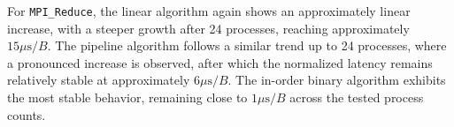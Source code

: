 \documentclass[a4paper]{article}
\begin{document}
For \texttt{MPI\_Reduce}, the linear algorithm again shows an approximately linear increase, with a steeper growth after 24 processes, reaching approximately $15\mu\mathrm{s}/B$. The pipeline algorithm follows a similar trend up to 24 processes, where a pronounced increase is observed, after which the normalized latency remains relatively stable at approximately $6\mu\mathrm{s}/B$. The in-order binary algorithm exhibits the most stable behavior, remaining close to $1\mu\mathrm{s}/B$ across the tested process counts.
\end{document}
